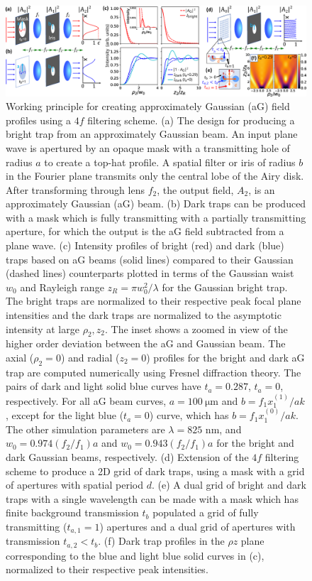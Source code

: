 \begin{figure}
    \includegraphics[width=\textwidth]{Images/figure1.eps}
    \caption{Working principle for creating approximately Gaussian (aG) field profiles using a $4f$ filtering scheme. (a) The design for producing a bright trap from an approximately Gaussian beam. An input plane wave is apertured by an opaque mask with a transmitting hole of radius $a$ to create a top-hat profile. A spatial filter or iris of radius $b$ in the Fourier plane transmits only the central lobe of the Airy disk. After transforming through lens $f_2$, the output field, $A_2$, is an approximately Gaussian (aG) beam. (b) Dark traps can be produced with a mask which is fully transmitting with a partially transmitting aperture, for which the output is the aG field subtracted from a plane wave. (c) Intensity profiles of bright (red) and dark (blue) traps based on aG beams (solid lines) compared to their Gaussian (dashed lines) counterparts plotted in terms of the Gaussian waist $w_0$ and Rayleigh range $z_R=\pi w_0^2/\lambda$ for the Gaussian bright trap. The bright traps are normalized to their respective peak focal plane intensities and the dark traps are normalized to the asymptotic intensity at large $\rho_2,z_2$. The inset shows a zoomed in view of the higher order deviation between the aG and Gaussian beam. The axial ($\rho_2=0$) and radial ($z_2=0$) profiles for the bright and dark aG trap are computed numerically using Fresnel diffraction theory. The pairs of dark and light solid blue curves have $t_a=0.287$, $t_a=0$, respectively. For all aG beam curves,  $a=100 ~\mathrm{ \mu m}$ and $b=f_1 x_1^{(1)}/a k$, except for the light blue ($t_a=0$) curve, which has $b=f_1 x_1^{(0)}/a k$. The other simulation parameters are $\lambda=825$ nm, and $w_0=0.974(f_2/f_1)a$ and $w_0=0.943(f_2/f_1)a$ for the bright and dark Gaussian beams, respectively. (d) Extension of the $4f$ filtering scheme to produce a 2D grid of dark traps, using a mask with a grid of apertures with spatial period $d$. (e) A dual grid of bright and dark traps with a single wavelength can be made with a mask which has finite background transmission $t_b$ populated a grid of fully transmitting ($t_{a,1}=1$) apertures and a dual grid of apertures with transmission $t_{a,2} < t_b$. (f) Dark trap profiles in the $\rho z$ plane corresponding to the blue and light blue solid curves in (c), normalized to their respective peak intensities.}
    \label{fig:working_principle}
\end{figure}
